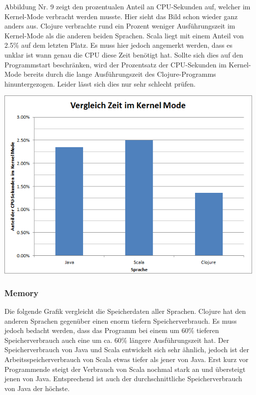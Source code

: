 \documentclass{fancydocument}
\begin{document}
Abbildung Nr. 9 zeigt den prozentualen Anteil an CPU-Sekunden auf, welcher im Kernel-Mode verbracht werden musste. Hier sieht das Bild schon wieder ganz anders aus. Clojure verbrachte rund ein Prozent weniger Ausführungszeit im Kernel-Mode als die anderen beiden Sprachen. Scala liegt mit einem Anteil von 2.5\% auf dem letzten Platz. Es muss hier jedoch angemerkt werden, dass es unklar ist wann genau die CPU diese Zeit benötigt hat. Sollte sich dies auf den Programmstart beschränken, wird der Prozentsatz der CPU-Sekunden im Kernel-Mode bereits durch die lange Ausführungszeit des Clojure-Programms hinuntergezogen. Leider lässt sich dies nur sehr schlecht prüfen.
\begin{center}
\includegraphics[width=\linewidth]{bilder/KernelModeAll.png}
\end{center}

\subsubsection{Memory}
Die folgende Grafik vergleicht die Speicherdaten aller Sprachen. Clojure hat den anderen Sprachen gegenüber einen enorm tiefern Speicherverbrauch. Es muss jedoch bedacht werden, dass das Programm bei einem um 60\% tieferen Speicherverbrauch auch eine um ca. 60\% längere Ausführungszeit hat. Der Speicherverbrauch von Java und Scala entwickelt sich sehr ähnlich, jedoch ist der Arbeitsspeicherverbrauch von Scala etwas tiefer als jener von Java. Erst kurz vor Programmende steigt der Verbrauch von Scala nochmal stark an und übersteigt jenen von Java. Entsprechend ist auch der durchschnittliche Speicherverbrauch von Java der höchste.
\end{document}

